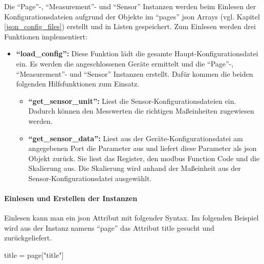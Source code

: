 Die \enquote{Page}-, \enquote{Measurement}- und \enquote{Sensor} Instanzen werden beim Einlesen der Konfigurationsdateien aufgrund der Objekte im \enquote{pages} \acs{json} Arrays (vgl. Kapitel \ref{json_config_files}) erstellt und in Listen gespeichert. \newline
Zum Einlesen werden drei Funktionen implementiert:
\begin{itemize}
	\item \textbf{\enquote{load\_config}:} Diese Funktion lädt die gesamte Haupt-Konfigurationsdatei ein. Es werden die angeschlossenen Geräte ermittelt und die \enquote{Page}-, \enquote{Measurement}- und \enquote{Sensor} Instanzen erstellt. Dafür kommen die beiden folgenden Hilfsfunktionen zum Einsatz.
    \begin{itemize}
		\item \textbf{\enquote{get\_sensor\_unit}:} Liest die Sensor-Konfigurationsdateien ein. Dadurch können den Messwerten die richtigen Maßeinheiten zugewiesen werden.
		\item \textbf{\enquote{get\_sensor\_data}:} Liest aus der Geräte-Konfigurationsdatei am angegebenen Port die Parameter aus und liefert diese Parameter als \acs{json} Objekt zurück. Sie liest das Register, den \gls{modbus} Function Code und die Skalierung aus. Die Skalierung wird anhand der Maßeinheit aus der Sensor-Konfigurationsdatei ausgewählt.
	\end{itemize}
\end{itemize}

\paragraph{Einlesen und Erstellen der Instanzen}
Einlesen kann man ein \acs{json} Attribut mit folgender Syntax. Im folgenden Beispiel wird aus der Instanz namens \enquote{page} das Attribut title gesucht und zurückgeliefert.
\begin{pythoncode}
title = page["title"]
\end{pythoncode}

